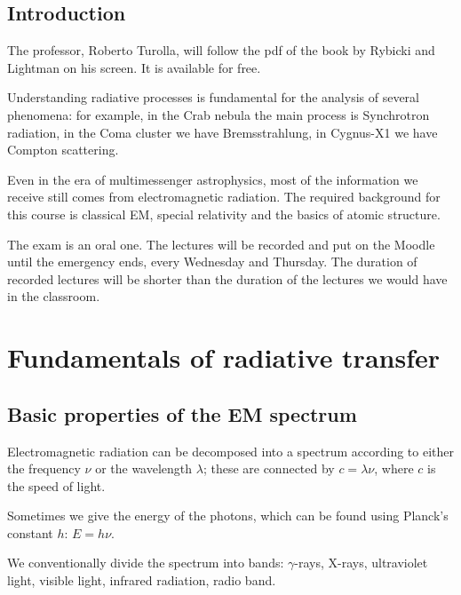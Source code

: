 \documentclass[main.tex]{subfiles}
\begin{document}
\section*{Introduction}

The professor, Roberto Turolla, will follow the pdf of the book by Rybicki and Lightman \cite{rybickiRadiativeProcessesAstrophysics1979} on his screen. It is available for free.

Understanding radiative processes is fundamental for the analysis of several phenomena: for example, in the Crab nebula the main process is Synchrotron radiation, in the Coma cluster we have Bremsstrahlung, in Cygnus-X1 we have Compton scattering. 

Even in the era of multimessenger astrophysics, most of the information we receive still comes from electromagnetic radiation. 
The required background for this course is classical EM, special relativity and the basics of atomic structure. 

The exam is an oral one. The lectures will be recorded and put on the Moodle until the emergency ends, every Wednesday and Thursday. 
The duration of recorded lectures will be shorter than the duration of the lectures we would have in the classroom.

\chapter{Fundamentals of radiative transfer}

\section{Basic properties of the EM spectrum}


Electromagnetic radiation can be decomposed into a spectrum according to either the frequency \(\nu \) or the wavelength \(\lambda \); these are connected by \(c = \lambda \nu \), where \(c\) is the speed of light. 

Sometimes we give the energy of the photons, which can be found using Planck's constant \(h\): \(E = h \nu \). 

We conventionally divide the spectrum into bands: \(\gamma \)-rays, X-rays, ultraviolet light, visible light, infrared radiation, radio band.
\end{document}
